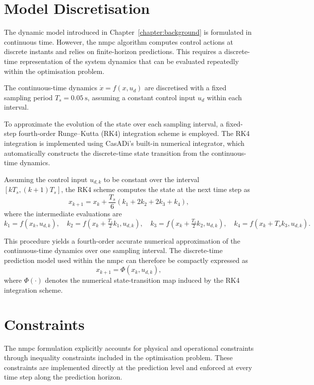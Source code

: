 \section{Model Discretisation}
\label{sec:discretization}

The dynamic model introduced in Chapter~\ref{chapter:background} is formulated in continuous time. However, the \gls{nmpc} algorithm computes control actions at discrete instants and relies on finite-horizon predictions. This requires a discrete-time representation of the system dynamics that can be evaluated repeatedly within the optimisation problem.

The continuous-time dynamics $\dot{x} = f(x, u_d)$ are discretised with a fixed sampling period $T_s = 0.05~\text{s}$, assuming a constant control input $u_d$ within each interval.


To approximate the evolution of the state over each sampling interval, a fixed-step fourth-order Runge--Kutta (RK4) integration scheme is employed. The RK4 integration is implemented using CasADi’s built-in numerical integrator, which automatically constructs the discrete-time state transition from the continuous-time dynamics.

Assuming the control input \(u_{d,k}\) to be constant over the interval \([kT_s, (k+1)T_s]\), the RK4 scheme computes the state at the next time step as
\[
x_{k+1} = x_k + \frac{T_s}{6}\left(k_1 + 2k_2 + 2k_3 + k_4\right),
\]
where the intermediate evaluations are
\[
k_1 = f(x_k, u_{d,k}), \quad
k_2 = f\!\left(x_k + \tfrac{T_s}{2}k_1, u_{d,k}\right), \quad
k_3 = f\!\left(x_k + \tfrac{T_s}{2}k_2, u_{d,k}\right), \quad
k_4 = f\!\left(x_k + T_s k_3, u_{d,k}\right).
\]


This procedure yields a fourth-order accurate numerical approximation of the continuous-time dynamics over one sampling interval. The discrete-time prediction model used within the \gls{nmpc} can therefore be compactly expressed as
\[
x_{k+1} = \Phi(x_k, u_{d,k}),
\]
where \(\Phi(\cdot)\) denotes the numerical state-transition map induced by the RK4 integration scheme.

\section{Constraints}
\label{sec:constraints}

The \gls{nmpc} formulation explicitly accounts for physical and operational constraints through inequality constraints included in the optimisation problem. These constraints are implemented directly at the prediction level and enforced at every time step along the prediction horizon.

